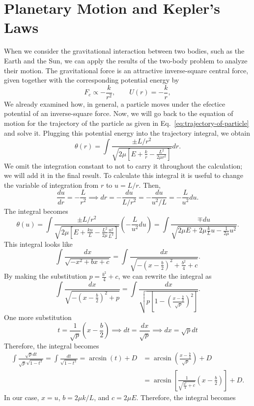 \documentclass[12pt]{article}
\begin{document}
\section{\label{sec:solution-of-the-equations-of-motion}Planetary Motion and Kepler's Laws}
When we consider the gravitational interaction between two bodies, such as the Earth and the Sun, we can apply the results of the two-body problem to analyze their motion. The gravitational force is an attractive inverse-square central force, given together with the corresponding potential energy by
\[
    F_c \propto-\frac{k}{r^2}, \qquad U(r) = -\frac{k}{r},
\]
We already examined how, in general, a particle moves under the efectice potential of an inverse-square force. Now, we will go back to the equation of motion for the trajectory of the particle as given in Eq.~\ref{eq:trajectory-of-particle} and solve it. Plugging this potential energy into the trajectory integral, we obtain
\[
    \theta(r) = \int \frac{\pm L/r^2}{\sqrt{2\mu \left[E + \frac{k}{r} - \frac{L^2}{2\mu r^2}\right]}}dr.
\]
We omit the integration constant to not to carry it throughout the calculation; we will add it in the final result. To calculate this integral it is useful to change the variable of integration from $r$ to $u = L/r$. Then, 
\[
    \frac{du}{dr} = -\frac{L}{r^2} \implies dr = -\frac{du}{L/r^2} = -\frac{du}{u^2/L} = -\frac{L}{u^2}du.
\]
The integral becomes
\[
    \theta(u) = \int \frac{\pm L/r^2}{\sqrt{2\mu \left[E + \frac{ku}{L} - \frac{L^2}{2\mu}\frac{u^2}{L^2}\right]}} \left(-\frac{L}{u^2}du\right) = \int \frac{\mp du}{\sqrt{2\mu E + 2 \mu \frac{k}{L}u - \frac{1}{2\mu}u^2}}.
\]
This integral looks like
\[
    \int \frac{dx}{\sqrt{-x^2 + bx + c}} = \int \frac{dx}{\sqrt{-\left(x-\frac{b}{2}\right)^2+\frac{b^2}{4}+c}}.
\]
By making the substitution $p=\frac{b^2}{4}+c$, we can rewrite the integral as
\[
    \int \frac{dx}{\sqrt{-\left(x-\frac{b}{2}\right)^2+p}}= \int \frac{dx}{\sqrt{p\left[1-\left(\frac{x-\frac{b}{2}}{\sqrt{p}}\right)^2\right]}}.
\]
One more substitution 
\[
t=\frac{1}{\sqrt{p}}\left( x - \frac{b}{2} \right) \implies dt = \frac{dx}{\sqrt{p}} \implies dx = \sqrt{p}dt
\]
Therefore, the integral becomes
\begin{align*}
    \int \frac{\sqrt{p}dt}{\sqrt{p}\sqrt{1-t^2}} = \int \frac{dt}{\sqrt{1-t^2}} = \arcsin(t) + D &= \arcsin\left(\frac{x-\frac{b}{2}}{\sqrt{p}}\right) + D \\ &= \arcsin{\left[\frac{1}{\sqrt{\frac{b^2}{4}+c}}\left(x-\frac{b}{2}\right)\right]}+D.
\end{align*}
In our case, $x=u$, $b=2\mu k/L$, and $c=2\mu E$. Therefore, the integral becomes
\end{document}
